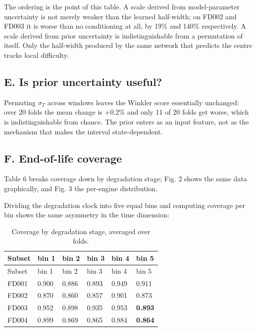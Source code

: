 The ordering is the point of this table. A scale derived from model-parameter uncertainty is not merely weaker than the learned half-width; on FD002 and FD003 it is worse than no conditioning at all, by 19\% and 140\% respectively. A scale derived from prior uncertainty is indistinguishable from a permutation of itself. Only the half-width produced by the same network that predicts the centre tracks local difficulty.

\subsection{E. Is prior uncertainty useful?}\label{e.-is-prior-uncertainty-useful}

Permuting \(\sigma_T\) across windows leaves the Winkler score essentially unchanged: over 20 folds the mean change is +0.2\% and only 11 of 20 folds get worse, which is indistinguishable from chance. The prior enters as an input feature, not as the mechanism that makes the interval state-dependent.

\subsection{F. End-of-life coverage}\label{f.-end-of-life-coverage}

Table 6 breaks coverage down by degradation stage; Fig. 2 shows the same data graphically, and Fig. 3 the per-engine distribution.

Dividing the degradation clock into five equal bins and computing coverage per bin shows the same asymmetry in the time dimension:

\begin{longtable}[]{@{}llllll@{}}
\caption{Coverage by degradation stage, averaged over folds.}\tabularnewline
\toprule\noalign{}
Subset & bin 1 & bin 2 & bin 3 & bin 4 & bin 5 \\
\midrule\noalign{}
\endfirsthead
\toprule\noalign{}
Subset & bin 1 & bin 2 & bin 3 & bin 4 & bin 5 \\
\midrule\noalign{}
\endhead
\bottomrule\noalign{}
\endlastfoot
FD001 & 0.900 & 0.886 & 0.893 & 0.949 & 0.911 \\
FD002 & 0.870 & 0.860 & 0.857 & 0.901 & 0.873 \\
FD003 & 0.952 & 0.898 & 0.935 & 0.953 & \textbf{0.893} \\
FD004 & 0.899 & 0.869 & 0.865 & 0.884 & \textbf{0.864} \\
\end{longtable}

